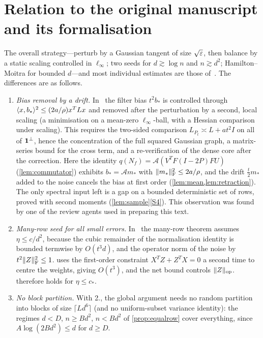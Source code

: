 \section{Relation to the original manuscript and its formalisation}\label{app:notes}

The overall strategy---perturb by a Gaussian tangent of size $\sqrt{\varepsilon}$, then
balance by a static scaling controlled in $\ell_\infty$; two seeds for
$d\gtrsim\log n$ and $n\gtrsim d^2$; Hamilton--Moitra for bounded $d$---and most
individual estimates are those of~\cite{Orig}. The differences are as follows.

\begin{enumerate}[label=\arabic*.]
\item \emph{Bias removal by a drift.} In~\cite{Orig} the filter bias $t^2b_*$ is
controlled through $\langle x,b_*\rangle^2\le(2a/\rho)x^TLx$ and removed after the
perturbation by a second, local scaling (a minimisation on a mean-zero
$\ell_\infty$-ball, with a Hessian comparison under scaling). This requires the
two-sided comparison $L_{P_t}\asymp L+at^2I$ on all of $\mathbf 1^\perp$, hence the
concentration of the full squared Gaussian graph, a matrix-series bound for the
cross term, and a re-verification of the dense core after the correction. Here
the identity $q(N_f)=\mathcal A(V^TF(I-2P)FU)$ (\cref{lem:commutator}) exhibits
$b_*=\mathcal Am_*$ with $\lVert m_*\rVert_{\mathrm F}^2\le2a/\rho$, and the drift $\frac t2m_*$
added to the noise cancels the bias at first order (\cref{lem:mean,lem:retraction}).
The only spectral input left is a gap on a bounded deterministic set of rows,
proved with second moments (\cref{lem:sample}\ref{S4}). This observation was
found by one of the review agents used in preparing this text.
\item \emph{Many-row seed for all small errors.} In~\cite{Orig} the many-row
theorem assumes $\eta\le c/d^2$, because the cubic remainder of the
normalisation identity is bounded termwise by $O(t^3d)$, and the operator norm of
the noise by $t^2\lVert Z\rVert_{\mathrm F}^2\le1$.  uses the first-order
constraint $X^TZ+Z^TX=0$ a second time to centre the weights, giving $O(t^3)$,
and the net bound controls $\lVert Z\rVert_{\mathrm{op}}$.  therefore holds for
$\eta\le c_*$.
\item \emph{No block partition.} With 2., the global argument needs no random
partition into blocks of size $\lceil Ld^6\rceil$ (and no uniform-subset variance
identity): the regimes $d<D$, $n\ge Bd^2$, $n<Bd^2$ of \cref{prop:equalrow}
cover everything, since $A\log(2Bd^2)\le d$ for $d\ge D$.

\end{enumerate}
